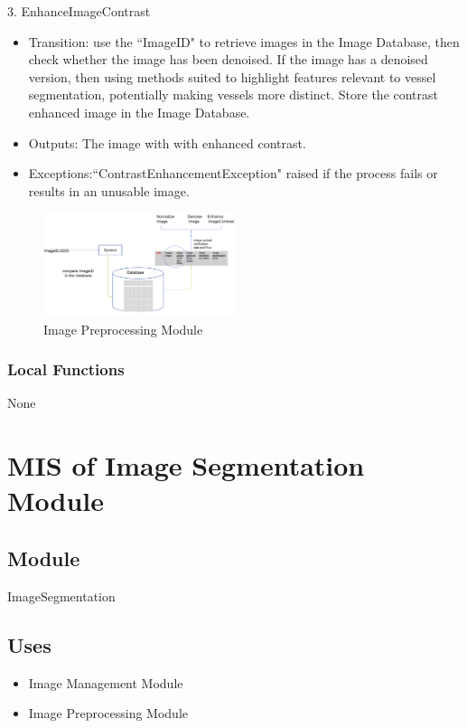 \documentclass[12pt, titlepage]{article}
\begin{document}
\begin{itemize}
3. EnhanceImageContrast
\begin{itemize}
    \item Transition: use the ``ImageID" to retrieve images in the Image Database, then check whether the image has been denoised. If the image has a denoised version, then using methods suited to highlight features relevant to vessel segmentation, potentially making vessels more distinct. Store the contrast enhanced image in the Image Database.
    \item Outputs: The image with with enhanced contrast.
    \item Exceptions:``ContrastEnhancementException" raised if the process fails or results in an unusable image.
\end{itemize}

\begin{figure}[H]
\centering
\includegraphics[width=0.5\textwidth]{4.png}
\caption{Image Preprocessing Module}
\label{Fig3}
\end{figure}
\subsubsection{Local Functions}
None


\newpage
\section{MIS of Image Segmentation Module} \label{m4} 

\subsection{Module}
ImageSegmentation

\subsection{Uses}

\begin{itemize}
    \item Image Management Module
    \item Image Preprocessing Module
\end{itemize}


\end{itemize}
\end{document}
